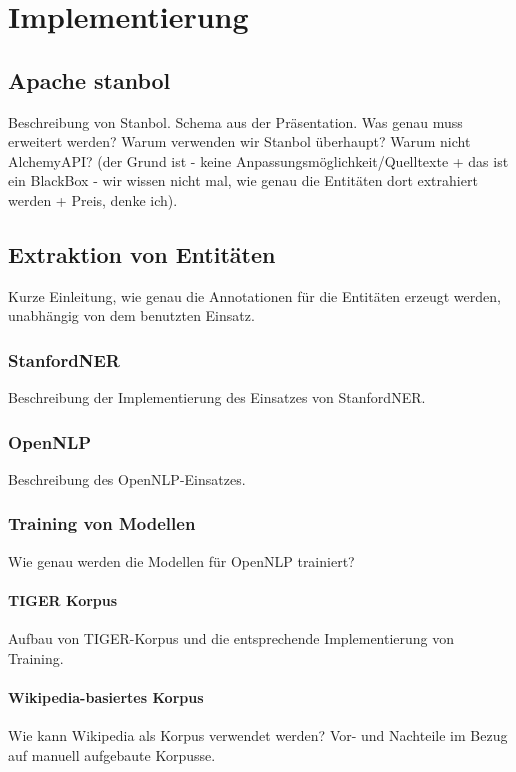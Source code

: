 \chapter{Implementierung}
\label{sec:Implementierung}

\section{Apache stanbol}
Beschreibung von Stanbol. Schema aus der Präsentation. Was genau muss erweitert werden? Warum verwenden wir Stanbol überhaupt? Warum nicht AlchemyAPI? (der Grund ist - keine Anpassungsmöglichkeit/Quelltexte + das ist ein BlackBox - wir wissen nicht mal, wie genau die Entitäten dort extrahiert werden + Preis, denke ich).

\section{Extraktion von Entitäten}
Kurze Einleitung, wie genau die Annotationen für die Entitäten erzeugt werden, unabhängig von dem benutzten Einsatz.

\subsection{StanfordNER} 
Beschreibung der Implementierung des Einsatzes von StanfordNER. 

\subsection{OpenNLP}
Beschreibung des OpenNLP-Einsatzes.

\subsection{Training von Modellen}
Wie genau werden die Modellen für OpenNLP trainiert?

\subsubsection{TIGER Korpus}
Aufbau von TIGER-Korpus und die entsprechende Implementierung von Training.

\subsubsection{Wikipedia-basiertes Korpus}
Wie kann Wikipedia als Korpus verwendet werden? Vor- und Nachteile im Bezug auf manuell aufgebaute Korpusse.

